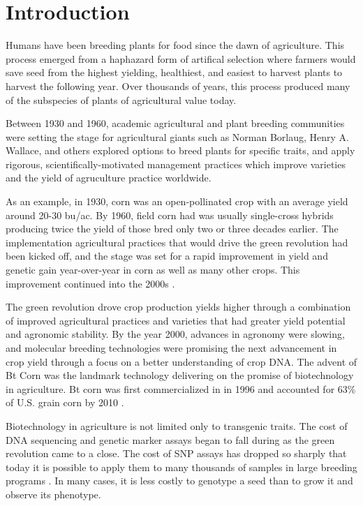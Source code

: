 \section{Introduction} \label{sec:gen-intro}

Humans have been breeding plants for food since the dawn of agriculture. This process
emerged from a haphazard form of artifical selection where farmers would save seed from the 
highest yielding, healthiest, and easiest to harvest plants to harvest the following year. 
Over thousands of years, this process produced many of the subspecies of plants of  
agricultural value today.

Between 1930 and 1960, academic agricultural and plant breeding communities were setting the
stage for agricultural giants such as Norman Borlaug, Henry A. Wallace, and others explored 
options to breed plants for specific traits, and apply rigorous, scientifically-motivated 
management practices which improve varieties and the yield of agruculture practice worldwide.

As an example, in 1930, corn was an open-pollinated crop with an average 
yield around 20-30 bu/ac. By 1960, field corn had was usually single-cross hybrids 
producing twice the yield of those bred only two or three decades earlier. The implementation
agricultural practices that would drive the green revolution had been kicked off, and
the stage was set for a rapid improvement in yield and genetic gain year-over-year in
corn as well as many other crops. This improvement continued into the 2000s \citep{evenson2003}.

The green revolution drove crop production yields higher through a combination of 
improved agricultural practices and varieties that had greater yield potential
and agronomic stability. By the year 2000, advances in agronomy were slowing, and 
molecular breeding technologies were promising the next advancement in crop yield
through a focus on a better understanding of crop DNA. The advent of Bt Corn was the
landmark technology delivering on the promise of biotechnology in agriculture.
Bt corn was first commercialized in in 1996 and accounted for 63\% of U.S. grain 
corn by 2010 \citep{fernandez2012}. 

Biotechnology in agriculture is not limited only to transgenic traits. The cost of 
DNA sequencing and genetic marker assays began to fall during as the green revolution
came to a close. The cost of SNP assays has dropped so sharply that today it is 
possible to apply them to many thousands of samples in large breeding programs \citep{hiremath2012}. 
In many cases, it is less costly to genotype a seed than to grow it and observe its phenotype.

